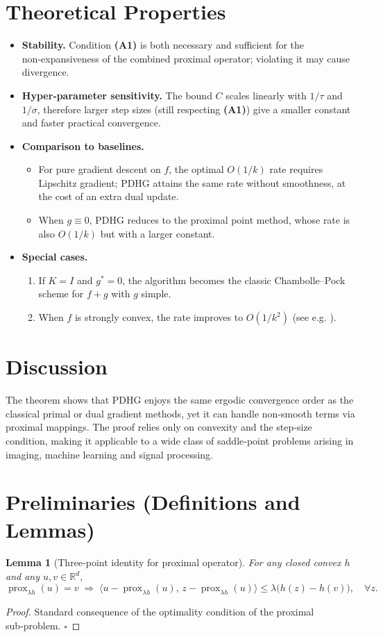 \documentclass{article}
\newtheorem{lemma}{Lemma}
\newcommand{\prox}{\operatorname{prox}}
\begin{document}
\section*{Theoretical Properties}
\begin{itemize}
\item \textbf{Stability.}  Condition \textbf{(A1)} is both necessary and sufficient for the non‑expansiveness of the combined proximal operator; violating it may cause divergence.
\item \textbf{Hyper‑parameter sensitivity.}  The bound $C$ scales linearly with $1/\tau$ and $1/\sigma$, therefore larger step sizes (still respecting \textbf{(A1)}) give a smaller constant and faster practical convergence.
\item \textbf{Comparison to baselines.}
    \begin{itemize}
        \item For pure gradient descent on $f$, the optimal $O(1/k)$ rate requires Lipschitz gradient; PDHG attains the same rate without smoothness, at the cost of an extra dual update.
        \item When $g\equiv0$, PDHG reduces to the proximal point method, whose rate is also $O(1/k)$ but with a larger constant.
    \end{itemize}
\item \textbf{Special cases.}
    \begin{enumerate}
        \item If $K=I$ and $g^{*}=0$, the algorithm becomes the classic Chambolle–Pock scheme for $f+g$ with $g$ simple.
        \item When $f$ is strongly convex, the rate improves to $O(1/k^{2})$ (see e.g. \cite{chambolle2011first}).
    \end{enumerate}
\end{itemize}

\section*{Discussion}
The theorem shows that PDHG enjoys the same ergodic convergence order as the classical primal or dual gradient methods, yet it can handle non‑smooth terms via proximal mappings. The proof relies only on convexity and the step‑size condition, making it applicable to a wide class of saddle‑point problems arising in imaging, machine learning and signal processing.

\newpage
\section*{Preliminaries (Definitions and Lemmas)}
\begin{lemma}[Three‑point identity for proximal operator]\label{lem:prox}
For any closed convex $h$ and any $u,v\in\mathbb R^{d}$,
\[
\prox_{\lambda h}(u)=v \;\Longrightarrow\;
\langle u-\prox_{\lambda h}(u),\,z-\prox_{\lambda h}(u)\rangle
\le \lambda\bigl(h(z)-h(v)\bigr),\quad\forall z .
\tag{3}
\]
\end{lemma}
\begin{proof}
Standard consequence of the optimality condition of the proximal sub‑problem. \(\square\)
\end{proof}
\end{document}
